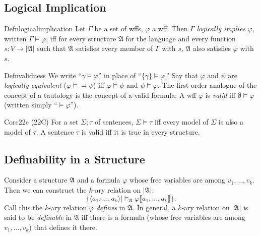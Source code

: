 \subsection*{Logical Implication}

\begin{reference}{Defn}{logicalimplication}
  Let $\Gamma$ be a set of wffs, $\varphi$ a wff. Then $\Gamma$ \textit{logically implies} $\varphi$, written $\Gamma\vDash\varphi$, iff for every structure $\mathfrak{A}$ for the language and every function $s: V\rightarrow|\mathfrak{A}|$ such that $\mathfrak{A}$ satisfies every member of $\Gamma$ with $s$, $\mathfrak{A}$ also satisfies $\varphi$ with $s$.
\end{reference}

\begin{reference}{Defn}{validness}
  We write ``$\gamma\vDash \varphi$'' in place of ``$\{\gamma\}\vDash \varphi$.'' Say that $\varphi$ and $\psi$ are \textit{logically equivalent} ($\varphi\vDash\Dashv \psi$) iff $\varphi\vDash \psi$ and $\psi\vDash \varphi$. The first-order analogue of the concept of a tautology is the concept of a valid formula: A wff $\varphi$ is \textit{valid} iff $\emptyset\vDash \varphi$ (written simply ``$\vDash \varphi$'').
\end{reference}

\begin{reference}{Cor}{c22c}
  (22C) For a set $\Sigma;\tau$ of sentences, $\Sigma\vDash \tau$ iff every model of $\Sigma$ is also a model of $\tau$. A sentence $\tau$ is valid iff it is true in every structure.
\end{reference}

\subsection*{Definability in a Structure}

Consider a structure $\mathfrak{A}$ and a formula $\varphi$ whose free variables are among $v_1,\dots,v_k$. Then we can construct the $k$-ary relation on $|\mathfrak{A}|$:
\[
  \{\langle a_1,\dots,a_k\rangle|\vDash_{\mathfrak{A}}\varphi\llbracket a_1,\dots,a_k\rrbracket\}.
\]
Call this the $k$-ary relation $\varphi$ \textit{defines} in $\mathfrak{A}$. In general, a $k$-ary relation on $|\mathfrak{A}|$ is said to be \textit{definable} in $\mathfrak{A}$ iff there is a formula (whose free variables are among $v_1,\dots,v_k$) that defines it there.

